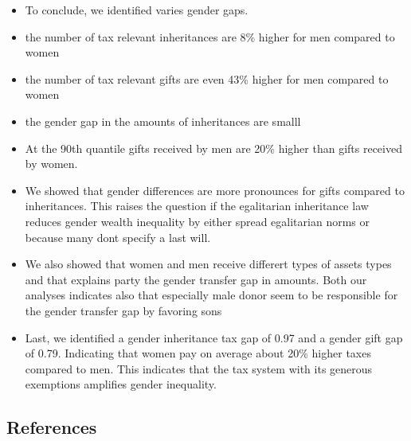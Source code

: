 \documentclass[
  letterpaper,
  DIV=11,
  numbers=noendperiod]{scrartcl}
\providecommand{\tightlist}{%
  \setlength{\itemsep}{0pt}\setlength{\parskip}{0pt}}\usepackage{longtable,booktabs,array}
\begin{document}
\begin{itemize}
\tightlist
\item
  To conclude, we identified varies gender gaps.
\item
  the number of tax relevant inheritances are 8\% higher for men
  compared to women
\item
  the number of tax relevant gifts are even 43\% higher for men compared
  to women
\item
  the gender gap in the amounts of inheritances are smalll
\item
  At the 90th quantile gifts received by men are 20\% higher than gifts
  received by women.
\item
  We showed that gender differences are more pronounces for gifts
  compared to inheritances. This raises the question if the egalitarian
  inheritance law reduces gender wealth inequality by either spread
  egalitarian norms or because many dont specify a last will.
\item
  We also showed that women and men receive differert types of assets
  types and that explains party the gender transfer gap in amounts. Both
  our analyses indicates also that especially male donor seem to be
  responsible for the gender transfer gap by favoring sons
\item
  Last, we identified a gender inheritance tax gap of 0.97 and a gender
  gift gap of 0.79. Indicating that women pay on average about 20\%
  higher taxes compared to men. This indicates that the tax system with
  its generous exemptions ampliﬁes gender inequality.
\end{itemize}

\hypertarget{references}{%
\subsection{References}\label{references}}
\end{document}
